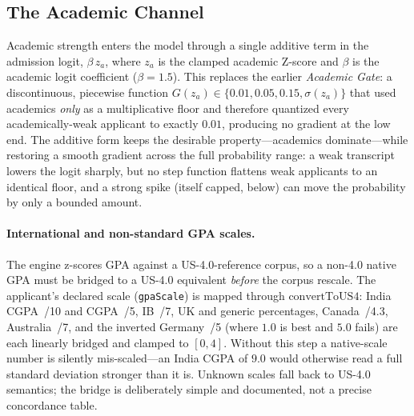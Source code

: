 \documentclass[conference]{IEEEtran}
\begin{document}
\subsection{The Academic Channel}
Academic strength enters the model through a single additive term in the admission logit, $\beta \, z_a$, where $z_a$ is the clamped academic Z-score and $\beta$ is the academic logit coefficient ($\beta = 1.5$). This replaces the earlier \textit{Academic Gate}: a discontinuous, piecewise function $G(z_a) \in \{0.01, 0.05, 0.15, \sigma(z_a)\}$ that used academics \textit{only} as a multiplicative floor and therefore quantized every academically-weak applicant to exactly $0.01$, producing no gradient at the low end. The additive form keeps the desirable property---academics dominate---while restoring a smooth gradient across the full probability range: a weak transcript lowers the logit sharply, but no step function flattens weak applicants to an identical floor, and a strong spike (itself capped, below) can move the probability by only a bounded amount.

\paragraph{International and non-standard GPA scales.}
The engine z-scores GPA against a US-4.0-reference corpus, so a non-4.0 native GPA must be bridged to a US-4.0 equivalent \textit{before} the corpus rescale. The applicant's declared scale (\texttt{gpaScale}) is mapped through $\mathrm{convertToUS4}$: India CGPA~/10 and CGPA~/5, IB~/7, UK and generic percentages, Canada~/4.3, Australia~/7, and the inverted Germany~/5 (where $1.0$ is best and $5.0$ fails) are each linearly bridged and clamped to $[0,4]$. Without this step a native-scale number is silently mis-scaled---an India CGPA of $9.0$ would otherwise read a full standard deviation stronger than it is. Unknown scales fall back to US-4.0 semantics; the bridge is deliberately simple and documented, not a precise concordance table.
\end{document}

